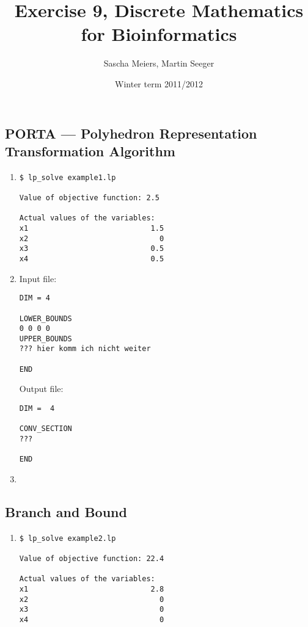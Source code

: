 \documentclass[a4paper, oneside]{scrartcl}
\author{Sascha Meiers, Martin Seeger}
\title{Exercise 9, Discrete Mathematics for Bioinformatics}
\date{Winter term 2011/2012}
\begin{document}
\maketitle


\subsection{PORTA --- Polyhedron Representation Transformation Algorithm}

\renewcommand{\labelenumi}{\alph{enumi})}
\begin{enumerate}
  \item 
\begin{verbatim}
$ lp_solve example1.lp 

Value of objective function: 2.5

Actual values of the variables:
x1                            1.5
x2                              0
x3                            0.5
x4                            0.5
\end{verbatim}

  \item 
Input file:
\begin{verbatim}
DIM = 4

LOWER_BOUNDS
0 0 0 0
UPPER_BOUNDS
??? hier komm ich nicht weiter

END
\end{verbatim}
Output file:
\begin{verbatim}
DIM =  4

CONV_SECTION
???

END
\end{verbatim}
\item 
\end{enumerate}

\subsection{Branch and Bound}

\begin{enumerate}
  \item 
\begin{verbatim}
$ lp_solve example2.lp 

Value of objective function: 22.4

Actual values of the variables:
x1                            2.8
x2                              0
x3                              0
x4                              0
\end{verbatim}
\end{enumerate}
  \item 
\end{document}
